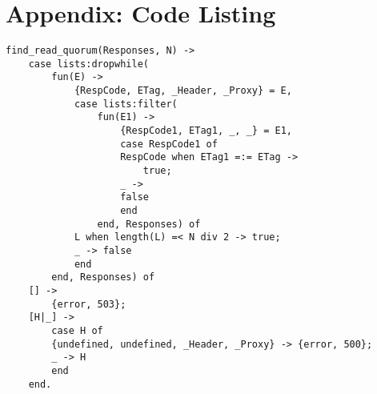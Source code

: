\appendix
\chapter*{Appendix: Code Listing}
\label{Appendix}

\begin{lstlisting}[caption=An Erlang function to find the first response for whose {\tt ETag} header field value (which is a document revision number) a majority exists.]
find_read_quorum(Responses, N) ->
    case lists:dropwhile(
        fun(E) ->
            {RespCode, ETag, _Header, _Proxy} = E,
            case lists:filter(
                fun(E1) ->
                    {RespCode1, ETag1, _, _} = E1,
                    case RespCode1 of
                    RespCode when ETag1 =:= ETag ->
                        true;
                    _ ->
                    false
                    end
                end, Responses) of
            L when length(L) =< N div 2 -> true;
            _ -> false
            end
        end, Responses) of
    [] ->
        {error, 503};
    [H|_] ->
        case H of
        {undefined, undefined, _Header, _Proxy} -> {error, 500};
        _ -> H
        end
    end.
\end{lstlisting}
